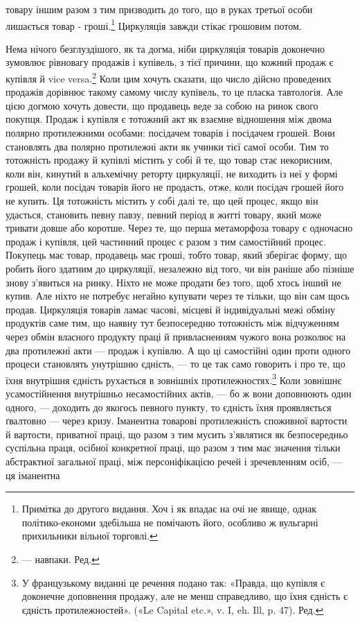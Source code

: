 товару іншим разом з тим призводить до того, що в руках третьої
особи лишається товар - гроші.\footnote{
Примітка до другого видання. Хоч і як впадає на очі не явище,
однак політико-економи здебільша не помічають його, особливо ж вульгарні
прихильники вільної торговлі.
} Циркуляція завжди стікає грошовим
потом.

Нема нічого безглуздішого, як та догма, ніби циркуляція
товарів доконечно зумовлює рівновагу продажів і купівель, з
тієї причини, що кожний продаж є купівля й vice versa.\footnote*{
— навпаки. Ред.
} Коли
цим хочуть сказати, що число дійсно проведених продажів дорівнює
такому самому числу купівель, то це пласка тавтологія.
Але цією догмою хочуть довести, що продавець веде за собою
на ринок свого покупця. Продаж і купівля є тотожний акт як
взаємне відношення між двома полярно протилежними особами:
посідачем товарів і посідачем грошей. Вони становлять два полярно
протилежні акти як учинки тієї самої особи. Тим то тотожність
продажу й купівлі містить у собі й те, що товар стає некорисним,
коли він, кинутий в альхемічну реторту циркуляції, не
виходить із неї у формі грошей, коли посідач товарів його не продасть,
отже, коли посідач грошей його не купить. Ця тотожність
містить у собі далі те, що цей процес, якщо він удасться, становить
певну павзу, певний період в житті товару, який може тривати
довше або коротше. Через те, що перша метаморфоза товару є
одночасно продаж і купівля, цей частинний процес є разом з
тим самостійний процес. Покупець має товар, продавець має
гроші, тобто товар, який зберігає форму, що робить його здатним
до циркуляції, незалежно від того, чи він раніше або пізніше
знову з’явиться на ринку. Ніхто не може продати без того, щоб
хтось інший не купив. Але ніхто не потребує негайно купувати
через те тільки, що він сам щось продав. Циркуляція товарів
ламає часові, місцеві й індивідуальні межі обміну продуктів
саме тим, що наявну тут безпосередню тотожність між відчуженням
через обмін власного продукту праці й привласненням
чужого вона розколює на два протилежні акти — продаж і купівлю.
А що ці самостійні один проти одного процеси становлять
унутрішню єдність, — то це так само говорить і про те, що їхня
внутрішня єдність рухається в зовнішніх протилежностях.\footnote*{
У французькому виданні це речення подано так: «Правда, що купівля
є доконечне доповнення продажу, але не менш справедливо, що
їхня єдність є єдність протилежностей». («Le Capital etc.», v. I, eh. Ill, p. 47).
Ред.
}
Коли зовнішнє усамостійнення внутрішньо несамостійних актів, —
бо ж вони доповнюють один одного, — доходить до якогось певного
пункту, то єдність їхня проявляється ґвалтовно — через
кризу. Іманентна товарові протилежність споживної вартости й
вартости, приватної праці, що разом з тим мусить з’являтися
як безпосередньо суспільна праця, осібної конкретної праці,
що разом з тим має значення тільки абстрактної загальної праці,
між персоніфікацією речей і зречевленням осіб, — ця іманентна